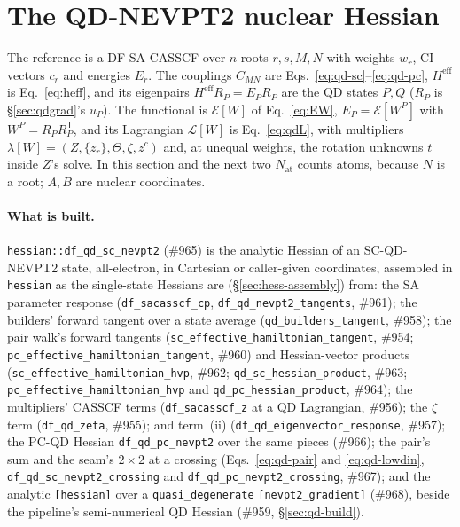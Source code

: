 \documentclass[11pt]{article}
\newcommand{\code}[1]{\texttt{#1}}
\newcommand{\Lag}{\mathcal L}
\newcommand{\Heff}{H^{\mathrm{eff}}}
\newcommand{\T}{\mathsf T}
\begin{document}
\section{The QD-NEVPT2 nuclear Hessian}
\label{sec:qdhess}

The reference is a DF-SA-CASSCF over $n$ roots $r, s, M, N$ with weights
$w_r$, CI vectors $c_r$ and energies $E_r$. The couplings $C_{MN}$ are
Eqs.~\eqref{eq:qd-sc}--\eqref{eq:qd-pc}, $\Heff$ is Eq.~\eqref{eq:heff}, and
its eigenpairs $\Heff R_P = E_PR_P$ are the QD states $P, Q$ ($R_P$ is
\S\ref{sec:qdgrad}'s $u_P$). The functional is $\mathcal E[W]$ of
Eq.~\eqref{eq:EW}, $E_P = \mathcal E[W^P]$ with $W^P = R_PR_P^\T$, and its
Lagrangian $\Lag[W]$ is Eq.~\eqref{eq:qdL}, with multipliers $\lambda[W] =
(Z, \{z_r\}, \Theta, \zeta, z^c)$ and, at unequal weights, the rotation
unknowns $t$ inside $Z$'s solve. In this section and the next two
$N_{\mathrm{at}}$ counts atoms, because $N$ is a root; $A, B$ are nuclear
coordinates.

\paragraph{What is built.} \code{hessian::df\_qd\_sc\_nevpt2} (\#965) is
the analytic Hessian of an SC-QD-NEVPT2 state, all-electron, in Cartesian or
caller-given coordinates, assembled in \code{hessian} as the single-state
Hessians are (\S\ref{sec:hess-assembly}) from: the SA parameter response
(\code{df\_sacasscf\_cp}, \code{df\_qd\_nevpt2\_tangents}, \#961); the
builders' forward tangent over a state average (\code{qd\_builders\_tangent},
\#958); the pair walk's forward tangents
(\code{sc\_effective\_hamiltonian\_tangent}, \#954;
\code{pc\_effective\_hamiltonian\_tangent}, \#960) and Hessian-vector
products (\code{sc\_effective\_hamiltonian\_hvp}, \#962;
\code{qd\_sc\_hessian\_product}, \#963; \code{pc\_effective\_hamiltonian\_hvp}
and \code{qd\_pc\_hessian\_product}, \#964); the multipliers' CASSCF terms
(\code{df\_sacasscf\_z} at a QD Lagrangian, \#956); the $\zeta$ term
(\code{df\_qd\_zeta}, \#955); and term~(ii)
(\code{df\_qd\_eigenvector\_response}, \#957); the PC-QD Hessian
\code{df\_qd\_pc\_nevpt2} over the same pieces (\#966); the pair's sum and
the seam's $2\times2$ at a crossing (Eqs.~\eqref{eq:qd-pair} and
\eqref{eq:qd-lowdin}, \code{df\_qd\_sc\_nevpt2\_crossing} and
\code{df\_qd\_pc\_nevpt2\_crossing}, \#967); and the analytic
\code{[hessian]} over a \code{quasi\_degenerate} \code{[nevpt2\_gradient]}
(\#968), beside the pipeline's semi-numerical QD Hessian (\#959,
\S\ref{sec:qd-build}).
\end{document}
